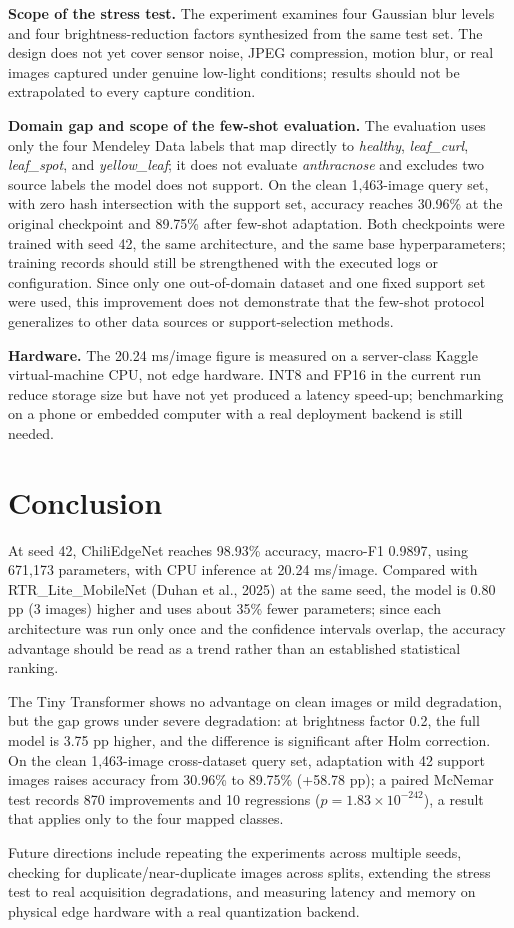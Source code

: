 \textbf{Scope of the stress test.} The experiment examines four Gaussian blur levels and four brightness-reduction factors synthesized from the same test set. The design does not yet cover sensor noise, JPEG compression, motion blur, or real images captured under genuine low-light conditions; results should not be extrapolated to every capture condition.

\textbf{Domain gap and scope of the few-shot evaluation.} The evaluation uses only the four Mendeley Data labels that map directly to \emph{healthy}, \emph{leaf\_curl}, \emph{leaf\_spot}, and \emph{yellow\_leaf}; it does not evaluate \emph{anthracnose} and excludes two source labels the model does not support. On the clean 1,463-image query set, with zero hash intersection with the support set, accuracy reaches 30.96\% at the original checkpoint and 89.75\% after few-shot adaptation. Both checkpoints were trained with seed 42, the same architecture, and the same base hyperparameters; training records should still be strengthened with the executed logs or configuration. Since only one out-of-domain dataset and one fixed support set were used, this improvement does not demonstrate that the few-shot protocol generalizes to other data sources or support-selection methods.

\textbf{Hardware.} The 20.24 ms/image figure is measured on a server-class Kaggle virtual-machine CPU, not edge hardware. INT8 and FP16 in the current run reduce storage size but have not yet produced a latency speed-up; benchmarking on a phone or embedded computer with a real deployment backend is still needed.

\FloatBarrier

\section{Conclusion}\label{conclusion}

At seed 42, ChiliEdgeNet reaches 98.93\% accuracy, macro-F1 0.9897, using 671,173 parameters, with CPU inference at 20.24 ms/image. Compared with RTR\_Lite\_MobileNet (Duhan et al., 2025) at the same seed, the model is 0.80 pp (3 images) higher and uses about 35\% fewer parameters; since each architecture was run only once and the confidence intervals overlap, the accuracy advantage should be read as a trend rather than an established statistical ranking.

The Tiny Transformer shows no advantage on clean images or mild degradation, but the gap grows under severe degradation: at brightness factor 0.2, the full model is 3.75 pp higher, and the difference is significant after Holm correction. On the clean 1,463-image cross-dataset query set, adaptation with 42 support images raises accuracy from 30.96\% to 89.75\% (+58.78 pp); a paired McNemar test records 870 improvements and 10 regressions ($p = 1.83 \times 10^{-242}$), a result that applies only to the four mapped classes.

Future directions include repeating the experiments across multiple seeds, checking for duplicate/near-duplicate images across splits, extending the stress test to real acquisition degradations, and measuring latency and memory on physical edge hardware with a real quantization backend.

